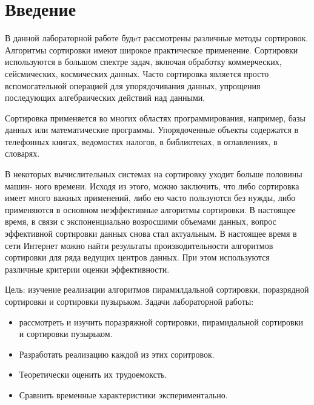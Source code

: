 \tableofcontents{}


\chapter{Введение}
\label{cha:appendix2}

В данной лабораторной работе будeт рассмотрены различные методы сортировок. Алгоритмы сортировки имеют широкое практическое применение. Сортировки используются в большом спектре задач, включая обработку коммерческих, сейсмических, космических данных. Часто сортировка является просто вспомогательной операцией для упорядочивания данных, упрощения последующих алгебраических действий над данными. 

Сортировка применяется во многих областях программирования, например, базы данных или математические программы. Упорядоченные объекты содержатся в телефонных книгах, ведомостях налогов, в библиотеках, в оглавлениях, в словарях. 

В некоторых вычислительных системах на сортировку уходит больше половины машин- ного времени. Исходя из этого, можно заключить, что либо сортировка имеет много важных применений, либо ею часто пользуются без нужды, либо применяются в основном неэффективные алгоритмы сортировки. В настоящее время, в связи с экспоненциально возросшими объемами данных, вопрос эффективной сортировки данных снова стал актуальным. 
В настоящее время в сети Интернет можно найти результаты производительности алгоритмов сортировки для ряда ведущих центров данных. При этом используются различные критерии оценки эффективности.

Цель:
изучение реализации алгоритмов пирамилдальной сортировки, поразрядной сортировки и сортировки пузырьком. 
Задачи лабораторной работы:
\begin{itemize}
    \item рассмотреть и изучить поразряжной сортировки, пирамидальной сортировки и сортировки пузырьком.
    \item Разработать реализацию каждой из этих соритровок.
    \item Теоретически оценить их трудоемоксть.
    \item Сравнить временные характеристики экспериментально.
\end{itemize}